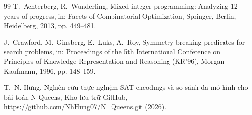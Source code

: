 \documentclass[a4paper,fleqn]{cas-sc}
\begin{document}
\begin{thebibliography}{99}
T.~Achterberg, R.~Wunderling, Mixed integer programming: Analyzing 12 years of progress, in: Facets of Combinatorial Optimization, Springer, Berlin, Heidelberg, 2013, pp. 449--481.

J.~Crawford, M.~Ginsberg, E.~Luks, A.~Roy, Symmetry-breaking predicates for search problems, in: Proceedings of the 5th International Conference on Principles of Knowledge Representation and Reasoning (KR'96), Morgan Kaufmann, 1996, pp. 148--159.

T.~N. Hưng, Nghiên cứu thực nghiệm SAT encodings và so sánh đa mô hình cho bài toán N-Queens, Kho lưu trữ GitHub, \url{https://github.com/NhHung07/N_Queens.git} (2026).

\end{thebibliography}
\end{document}
